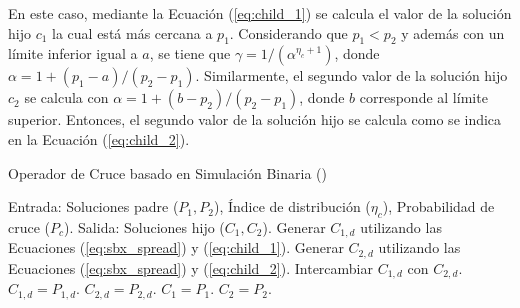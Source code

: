 En este caso, mediante la Ecuación (\ref{eq:child_1}) se calcula el valor de la solución hijo $c_1$ la cual está más cercana a $p_1$.
%
Considerando que $p_1 < p_2$ y además con un límite inferior igual a $a$, se tiene que $\gamma = 1/(\alpha^{\eta_c + 1})$, donde $\alpha = 1 + (p_1 - a) / (p_2 - p_1)$.
%
Similarmente, el segundo valor de la solución hijo $c_2$ se calcula con $\alpha = 1 + (b-p_2)/(p_2 - p_1)$, donde $b$ corresponde al límite superior.
%
Entonces, el segundo valor de la solución hijo se calcula como se indica en la Ecuación (\ref{eq:child_2}).

\begin{algorithm}[t]
\scriptsize
\caption{Operador de Cruce basado en Simulación Binaria (\SBX{})}
\label{alg:SBX_Operator}
\begin{algorithmic}[1]
    \STATE Entrada: Soluciones padre ($P_{1}, P_{2}$), Índice de distribución ($\eta_c$), Probabilidad de cruce ($P_c$).
    \STATE Salida: Soluciones hijo ($C_{1}, C_{2}$).
	 \label{alg:inherit_variable}
		\STATE Generar $C_{1,d}$ utilizando las Ecuaciones (\ref{eq:sbx_spread}) y (\ref{eq:child_1}).
		\STATE Generar $C_{2,d}$ utilizando las Ecuaciones (\ref{eq:sbx_spread}) y (\ref{eq:child_2}).
			\STATE Intercambiar $C_{1,d}$ con $C_{2,d}$.
		 \ENDIF
        \ELSE
	   \STATE $C_{1,d} = P_{1, d}$.
	   \STATE $C_{2,d} = P_{2, d}$.
        \ENDIF
       \ENDFOR
    \ELSE
	\STATE $C_{1} = P_{1}$.
	\STATE $C_{2} = P_{2}$.
    \ENDIF
\end{algorithmic}
\end{algorithm}

